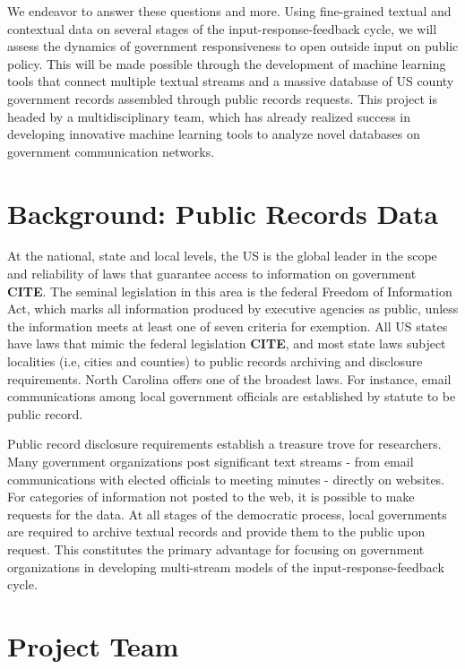 We endeavor to answer these questions and more. Using fine-grained textual and contextual data on several stages of the input-response-feedback cycle, we will assess the dynamics of government responsiveness to open outside input on public policy. This will be made possible through the development of machine learning tools that connect multiple textual streams and a massive database of US county government records assembled through public records requests. This project is headed by a multidisciplinary team, which has already realized success in developing innovative machine learning tools to analyze novel databases on government communication networks. 


\section{Background: Public Records Data}

At the national, state and local levels, the US is the global leader in the scope and reliability of laws that guarantee access to information on government {\bf CITE}. The seminal legislation in this area is the federal Freedom of Information Act, which marks all information produced by executive agencies as public, unless the information meets at least one of seven criteria for exemption. All US states have laws that mimic the federal legislation {\bf CITE}, and most state laws subject localities (i.e, cities and counties) to public records archiving and disclosure requirements. North Carolina offers one of the broadest laws. For instance, email communications among local government officials are established by statute to be public record. 

Public record disclosure requirements establish a treasure trove for researchers. Many government organizations post significant text streams - from email communications with elected officials to meeting minutes - directly on websites. For categories of information not posted to the web, it is possible to make requests for the data. At all stages of the democratic process, local governments are required to archive textual records and provide them to the public upon request. This constitutes the primary advantage for focusing on government organizations in developing multi-stream models of the input-response-feedback cycle. 

\section{Project Team}

